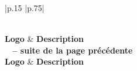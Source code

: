     \begin{longtable}[c]{
        |p{}
        |p{}|
    }
        \caption{Description des Logiciels, Bibliothèques et Frameworks}
        \label{tab:softwaredesc}\\
        \hline
        \textbf{Logo} & \textbf{Description} \\
        \hline
        \endfirsthead
        {{\bfseries \tablename\ \thetable{} -- suite de la page précédente}} \\
        \hline
        \textbf{Logo} & \textbf{Description} \\
        \hline
        \endhead
        \hline {} \\ \hline
        \endfoot
        \hline
        \endlastfoot
        

\end{longtable}
